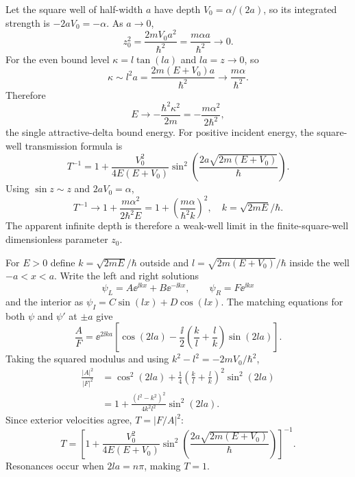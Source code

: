 Let the square well of half-width $a$ have depth
$V_0=\alpha/(2a)$, so its integrated strength
is $-2aV_0=-\alpha$. As $a\to0$,
\begin{equation}
z_0^2=\frac{2mV_0a^2}{\hbar^2}
=\frac{m\alpha a}{\hbar^2}\longrightarrow0.
\end{equation}
For the even bound level $\kappa=l\tan(la)$ and
$la=z\to0$, so
\begin{equation}
\kappa\sim l^2a
=\frac{2m(E+V_0)a}{\hbar^2}
\longrightarrow\frac{m\alpha}{\hbar^2}.
\end{equation}
Therefore
\begin{equation}
\boxed{E\longrightarrow
-\frac{\hbar^2\kappa^2}{2m}
=-\frac{m\alpha^2}{2\hbar^2}},
\end{equation}
the single attractive-delta bound energy.
For positive incident energy,
the square-well transmission formula is
\begin{equation}
T^{-1}=1+\frac{V_0^2}{4E(E+V_0)}
\sin^2\left(\frac{2a\sqrt{2m(E+V_0)}}{\hbar}\right).
\end{equation}
Using $\sin z\sim z$ and $2aV_0=\alpha$,
\begin{equation}
T^{-1}\to1+\frac{m\alpha^2}{2\hbar^2 E}
=1+\left(\frac{m\alpha}{\hbar^2k}\right)^2,
\quad k=\sqrt{2mE}/\hbar.
\end{equation}
The apparent infinite depth is therefore
a weak-well limit in the finite-square-well
dimensionless parameter $z_0$.

For $E>0$ define
$k=\sqrt{2mE}/\hbar$ outside and
$l=\sqrt{2m(E+V_0)}/\hbar$ inside
the well $-a<x<a$.
Write the left and right solutions
\begin{equation}
\psi_L=A\ee^{\ii kx}+B\ee^{-\ii kx},\qquad
\psi_R=F\ee^{\ii kx}
\end{equation}
and the interior as
$\psi_I=C\sin(lx)+D\cos(lx)$.
The matching equations for both $\psi$ and
$\psi'$ at $\pm a$ give
\begin{equation}
\frac{A}{F}
=\ee^{2\ii ka}
\left[\cos(2la)-\frac{\ii}{2}
\left(\frac{k}{l}+\frac{l}{k}\right)\sin(2la)\right].
\end{equation}
Taking the squared modulus and using
$k^2-l^2=-2mV_0/\hbar^2$,
\begin{align}
\frac{|A|^2}{|F|^2}
&=\cos^2(2la)+\frac14
\left(\frac{k}{l}+\frac{l}{k}\right)^2\sin^2(2la)\\
&=1+\frac{(l^2-k^2)^2}{4k^2l^2}\sin^2(2la).
\end{align}
Since exterior velocities agree, $T=|F/A|^2$:
\begin{equation}
\boxed{T=
\left[1+\frac{V_0^2}{4E(E+V_0)}
\sin^2\left(\frac{2a\sqrt{2m(E+V_0)}}{\hbar}\right)
\right]^{-1}}.
\end{equation}
Resonances occur when $2la=n\pi$, making $T=1$.

